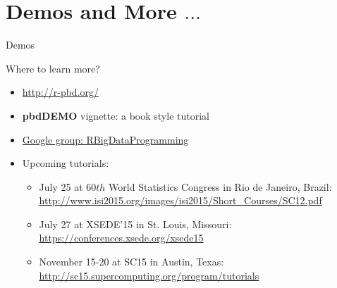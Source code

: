 \section{Demos and More $\ldots$}

\begin{frame}
  \begin{center}
    \LARGE Demos
  \end{center}
\end{frame}

\begin{frame}
  \begin{block}{Where to learn more?}
  \begin{itemize}
    \item \url{http://r-pbd.org/}
    \item \textbf{pbdDEMO} vignette: a book style tutorial
    \item \url{Google group: RBigDataProgramming}
    \item Upcoming tutorials:
      \begin{itemize}\scriptsize
      \item July 25 at 60$th$ World Statistics Congress in Rio de
        Janeiro, Brazil:
        \url{http://www.isi2015.org/images/isi2015/Short\_Courses/SC12.pdf}
      \item July 27 at XSEDE'15 in St. Louis, Missouri:
        \url{https://conferences.xsede.org/xsede15}
      \item November 15-20 at SC15 in Austin, Texas:
        \url{http://sc15.supercomputing.org/program/tutorials}
      \end{itemize}
    \end{itemize}
  \end{block}
\end{frame}

